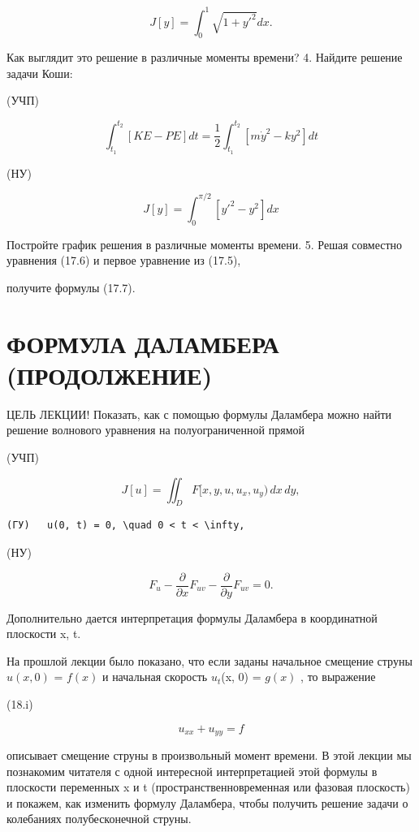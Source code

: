 \documentclass[
  ukrainian,
]{article}
\begin{document}
\[
J[y] = \int_{0}^{1} \sqrt{1 + y'^{2}} dx.
\]

Как выглядит это решение в различные моменты времени? 4. Найдите решение
задачи Коши:

(УЧП)

\[
\int_{t_{1}}^{t_{2}} [KE - PE] dt = \frac{1}{2} \int_{t_{1}}^{t_{2}} [m\dot{y}^{2} - ky^{2}] dt
\]

(НУ)

\[
J[y] = \int_{0}^{\pi/2} [y'^{2} - y^{2}] dx
\]

Постройте график решения в различные моменты времени. 5. Решая совместно
уравнения (17.6) и первое уравнение из (17.5),

получите формулы (17.7).

\section{ФОРМУЛА ДАЛАМБЕРА
(ПРОДОЛЖЕНИЕ)}\label{ux444ux43eux440ux43cux443ux43bux430-ux434ux430ux43bux430ux43cux431ux435ux440ux430-ux43fux440ux43eux434ux43eux43bux436ux435ux43dux438ux435}

ЦЕЛЬ ЛЕКЦИИ! Показать, как с помощью формулы Даламбера можно найти
решение волнового уравнения на полуограниченной прямой

(УЧП)

\[
J[u] = \iint_D F[x, y, u, u_x, u_y) \, dx \, dy,
\]

\begin{verbatim}
(ГУ)   u(0, t) = 0, \quad 0 < t < \infty,
\end{verbatim}

(НУ)

\[
F_{u} - \frac{\partial}{\partial x} F_{uv} - \frac{\partial}{\partial y} F_{uv} = 0.
\]

Дополнительно дается интерпретация формулы Даламбера в координатной
плоскости x, t.

На прошлой лекции было показано, что если заданы начальное смещение
струны \(u(x, 0)\) = \(f(x)\) и начальная скорость \(u_t\)(x, 0) =
\(g(x)\) , то выражение

(18.i)

\[
u_{xx} + u_{yy} = f
\]

описывает смещение струны в произвольный момент времени. В этой лекции
мы познакомим читателя с одной интересной интерпретацией этой формулы в
плоскости переменных x и t (пространственновременная или фазовая
плоскость) и покажем, как изменить формулу Даламбера, чтобы получить
решение задачи о колебаниях полубесконечной струны.
\end{document}
